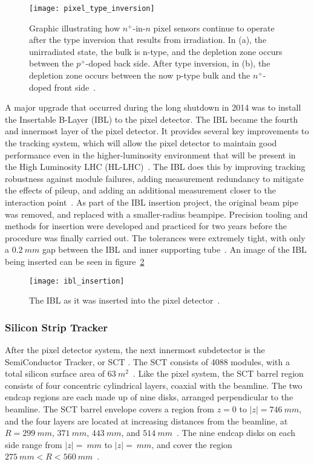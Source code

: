 \begin{figure}[!ht]\centering
\texttt{[image: pixel\_type\_inversion]}
\caption{Graphic illustrating how $n^+$-in-$n$ pixel sensors continue to operate after the type inversion that results from irradiation.
In (a), the unirradiated state, the bulk is n-type, and the depletion zone occurs between the $p^+$-doped back side.
After type inversion, in (b), the depletion zone occurs between the now p-type bulk and the $n^+$-doped front side~\cite{pixels-2008}.}
\label{fig:pixel_type_inversion}
\end{figure}

A major upgrade that occurred during the long shutdown in 2014 was to install the Insertable B-Layer (IBL) to the pixel detector.
The IBL became the fourth and innermost layer of the pixel detector.
It provides several key improvements to the tracking system, which will allow the pixel detector to maintain good performance even in the higher-luminosity environment that will be present in the High Luminosity LHC (HL-LHC)~\cite{ibl-tdr}.
The IBL does this by improving tracking robustness against module failures, adding measurement redundancy to mitigate the effects of pileup, and adding an additional measurement closer to the interaction point~\cite{ibl-tdr}.
As part of the IBL insertion project, the original beam pipe was removed, and replaced with a smaller-radius beampipe.
Precision tooling and methods for insertion were developed and practiced for two years before the procedure was finally carried out.
The tolerances were extremely tight, with only a $0.2~mm$ gap between the IBL and inner supporting tube~\cite{ibl-website}.
An image of the IBL being inserted can be seen in figure~\ref{fig:ibl_insertion}

\begin{figure}[!ht]\centering
\texttt{[image: ibl\_insertion]}
\caption{The IBL as it was inserted into the pixel detector~\cite{ibl-website}.}
\label{fig:ibl_insertion}
\end{figure}

\subsubsection{Silicon Strip Tracker}\label{subsubsec:sct}

After the pixel detector system, the next innermost subdetector is the SemiConductor Tracker, or SCT .
The SCT consists of 4088 modules, with a total silicon surface area of $63~m^2$~\cite{atlas-detector-2008}.
Like the pixel system, the SCT barrel region consists of four concentric cylindrical layers, coaxial with the beamline.
The two endcap regions are each made up of nine disks, arranged perpendicular to the beamline.
The SCT barrel envelope covers a region from $z = 0$ to $|z|  = 746~mm$, and the four layers are located at increasing distances from the beamline, at $R = 299~mm$, $371~mm$, $443~mm$, and $514~mm$~\cite{sct-barrel-2006}.
The nine endcap disks on each side range from $|z| = ~mm$ to $|z| = ~mm$, and cover the region $275~mm < R < 560~mm$~\cite{atlas-detector-2008}.

